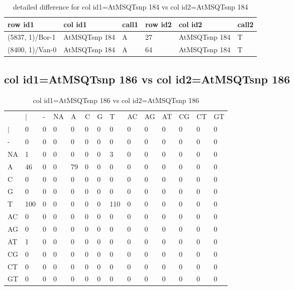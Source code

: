 \begin{center}
\begin{longtable}{|l|l|l|l|l|l|}
\caption{detailed difference for col id1=AtMSQTsnp 184 vs col id2=AtMSQTsnp 184} \label{table_dm749}\\
\hline
row id1&col id1&call1&row id2&col id2&call2\\
\hline
(5837, 1)/Bor-1&AtMSQTsnp 184&A&27&AtMSQTsnp 184&T\\
(8400, 1)/Van-0&AtMSQTsnp 184&A&64&AtMSQTsnp 184&T\\
\hline
\end{longtable}
\end{center}

\subsection{col id1=AtMSQTsnp 186 vs col id2=AtMSQTsnp 186}
\begin{center}
\begin{longtable}{|l|l|l|l|l|l|l|l|l|l|l|l|l|l|}
\caption{col id1=AtMSQTsnp 186 vs col id2=AtMSQTsnp 186} \label{table_dm750}\\
\hline
\\
\hline
&$|$&-&NA&A&C&G&T&AC&AG&AT&CG&CT&GT\\
$|$&0&0&0&0&0&0&0&0&0&0&0&0&0\\
-&0&0&0&0&0&0&0&0&0&0&0&0&0\\
NA&1&0&0&0&0&0&3&0&0&0&0&0&0\\
A&46&0&0&79&0&0&0&0&0&0&0&0&0\\
C&0&0&0&0&0&0&0&0&0&0&0&0&0\\
G&0&0&0&0&0&0&0&0&0&0&0&0&0\\
T&100&0&0&0&0&0&110&0&0&0&0&0&0\\
AC&0&0&0&0&0&0&0&0&0&0&0&0&0\\
AG&0&0&0&0&0&0&0&0&0&0&0&0&0\\
AT&1&0&0&0&0&0&0&0&0&0&0&0&0\\
CG&0&0&0&0&0&0&0&0&0&0&0&0&0\\
CT&0&0&0&0&0&0&0&0&0&0&0&0&0\\
GT&0&0&0&0&0&0&0&0&0&0&0&0&0\\
\hline
\end{longtable}
\end{center}

